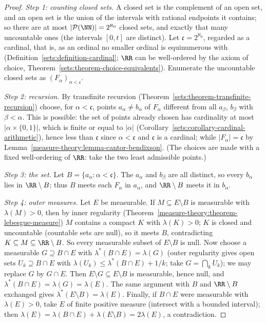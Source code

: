 \begin{proof}
\emph{Step 1: counting closed sets.} A closed set is the complement of an open set, and an open set is the union of the intervals with rational endpoints it contains; so there are at most
$|\mathcal{P}(\NN)| = 2^{\aleph_0}$ closed sets, and exactly that many uncountable ones (the intervals $[0, t]$ are distinct). Let $\mathfrak{c} = 2^{\aleph_0}$, regarded as a cardinal, that is, as an
ordinal no smaller ordinal is equinumerous with (Definition~\ref{sets:definition-cardinal}; $\RR$ can be well-ordered by the axiom of choice, Theorem~\ref{sets:theorem-choice-equivalents}). Enumerate the
uncountable closed sets as $(F_\alpha)_{\alpha < \mathfrak{c}}$.

\emph{Step 2: recursion.} By transfinite recursion (Theorem~\ref{sets:theorem-transfinite-recursion}) choose, for $\alpha < \mathfrak{c}$, points $a_\alpha \neq b_\alpha$ of $F_\alpha$ different from all
$a_\beta$, $b_\beta$ with $\beta < \alpha$. This is possible: the set of points already chosen has cardinality at most $|\alpha \times \{0, 1\}|$, which is finite or equal to $|\alpha|$
(Corollary~\ref{sets:corollary-cardinal-arithmetic}), hence less than $\mathfrak{c}$ since $\alpha < \mathfrak{c}$ and $\mathfrak{c}$ is a cardinal; while $|F_\alpha| = \mathfrak{c}$ by
Lemma~\ref{measure-theory:lemma-cantor-bendixson}. (The choices are made with a fixed well-ordering of $\RR$: take the two least admissible points.)

\emph{Step 3: the set.} Let $B = \{a_\alpha : \alpha < \mathfrak{c}\}$. The $a_\alpha$ and $b_\beta$ are all distinct, so every $b_\alpha$ lies in $\RR \setminus B$; thus $B$ meets each $F_\alpha$ in
$a_\alpha$, and $\RR \setminus B$ meets it in $b_\alpha$.

\emph{Step 4: outer measures.} Let $E$ be measurable. If $M \subseteq E \setminus B$ is measurable with $\lambda(M) > 0$, then by inner regularity (Theorem~\ref{measure-theory:theorem-lebesgue-measure}) $M$
contains a compact $K$ with $\lambda(K) > 0$; $K$ is closed and uncountable (countable sets are null), so it meets $B$, contradicting $K \subseteq M \subseteq \RR \setminus B$. So every measurable
subset of $E \setminus B$ is null. Now choose a measurable $G \supseteq B \cap E$ with $\lambda^*(B \cap E) = \lambda(G)$ (outer regularity gives open sets $U_k \supseteq B \cap E$ with
$\lambda(U_k) \leq \lambda^*(B \cap E) + 1/k$; take $G = \bigcap_kU_k$); we may replace $G$ by $G \cap E$. Then $E \setminus G \subseteq E \setminus B$ is measurable, hence null, and
$\lambda^*(B \cap E) = \lambda(G) = \lambda(E)$. The same argument with $B$ and $\RR \setminus B$ exchanged gives $\lambda^*(E \setminus B) = \lambda(E)$. Finally, if $B \cap E$ were measurable with
$\lambda(E) > 0$, take $E$ of finite positive measure (intersect with a bounded interval); then $\lambda(E) = \lambda(B \cap E) + \lambda(E \setminus B) = 2\lambda(E)$, a contradiction.
\end{proof}


